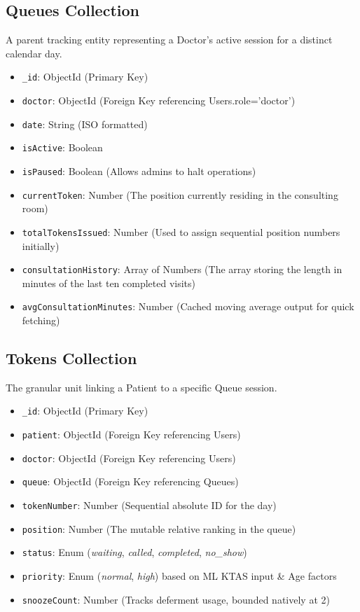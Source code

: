 \documentclass[12pt,a4paper]{article}
\begin{document}
\subsection{Queues Collection}
A parent tracking entity representing a Doctor's active session for a distinct calendar day.
\begin{itemize}
    \item \texttt{\_id}: ObjectId (Primary Key)
    \item \texttt{doctor}: ObjectId (Foreign Key referencing Users.role='doctor')
    \item \texttt{date}: String (ISO formatted)
    \item \texttt{isActive}: Boolean 
    \item \texttt{isPaused}: Boolean (Allows admins to halt operations)
    \item \texttt{currentToken}: Number (The position currently residing in the consulting room)
    \item \texttt{totalTokensIssued}: Number (Used to assign sequential position numbers initially)
    \item \texttt{consultationHistory}: Array of Numbers (The array storing the length in minutes of the last ten completed visits)
    \item \texttt{avgConsultationMinutes}: Number (Cached moving average output for quick fetching)
\end{itemize}

\subsection{Tokens Collection}
The granular unit linking a Patient to a specific Queue session.
\begin{itemize}
    \item \texttt{\_id}: ObjectId (Primary Key)
    \item \texttt{patient}: ObjectId (Foreign Key referencing Users)
    \item \texttt{doctor}: ObjectId (Foreign Key referencing Users)
    \item \texttt{queue}: ObjectId (Foreign Key referencing Queues)
    \item \texttt{tokenNumber}: Number (Sequential absolute ID for the day)
    \item \texttt{position}: Number (The mutable relative ranking in the queue)
    \item \texttt{status}: Enum (\textit{waiting}, \textit{called}, \textit{completed}, \textit{no\_show})
    \item \texttt{priority}: Enum (\textit{normal}, \textit{high}) based on ML KTAS input \& Age factors
    \item \texttt{snoozeCount}: Number (Tracks deferment usage, bounded natively at 2)
\end{itemize}
\end{document}
